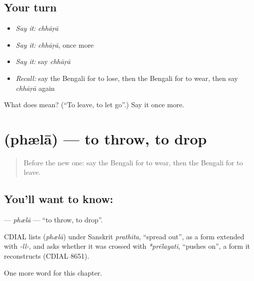 \subsection*{Your turn}
\begin{itemize}
\raggedright
  \item \emph{Say it:} \emph{chhāṛā}
  \item \emph{Say it:} \emph{chhāṛā}, once more
  \item \emph{Say it:} say \emph{chhāṛā}
  \item \emph{Recall:} say the Bengali for to lose, then the Bengali for to wear, then say \emph{chhāṛā} again
\end{itemize}

\begin{tcolorbox}[breakable,colback=teal!4,colframe=teal!35!black,title={Before you move on}]
What does  mean? (\textquotedblleft{}To leave, to let go\textquotedblright{}.) Say it once more.
\end{tcolorbox}
\section[\texorpdfstring{\bn{ফেলা} (phælā)}{ফেলা (phælā)}]{ (phælā) — to throw, to drop}

\label{lesson:BN-C53-phla}



\begin{quote}
Before the new one: say the Bengali for to wear, then the Bengali for to leave.
\end{quote}

\subsection*{You'll want to know: }
\textbf{} — \emph{phælā} — \textquotedblleft{}to throw, to drop\textquotedblright{}.

\begin{cousinweb}
CDIAL lists \textbf{} (\emph{phælā}) under Sanskrit \emph{prathita}, \textquotedblleft{}spread out\textquotedblright{}, as a form extended with \emph{-ll-}, and asks whether it was crossed with \emph{*prēlayati}, \textquotedblleft{}pushes on\textquotedblright{}, a form it reconstructs (CDIAL 8651).
\end{cousinweb}

\begin{grammarlens}[title={What you've built}]
One more word for this chapter.
\end{grammarlens}

